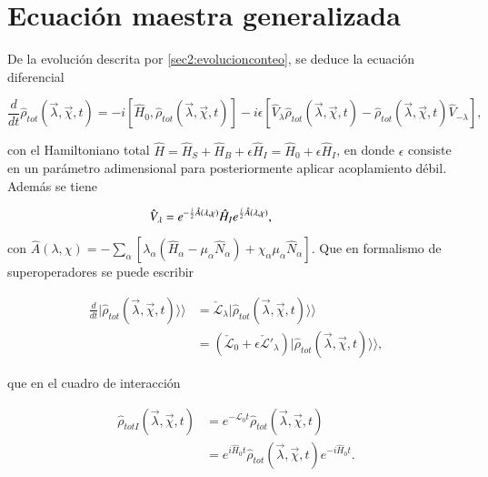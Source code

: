 \label{sec2:superop}

\newpage

\section{Ecuación maestra generalizada}
De la evolución descrita por \ref{sec2:evolucionconteo}, se deduce la ecuación diferencial

\begin{equation*}
    \frac{d}{dt}\hat{\rho}_{tot}(\vec{\lambda},\vec{\chi},t) = -i[\hat{H}_{0},\hat{\rho}_{tot}(\vec{\lambda},\vec{\chi},t)] - i\epsilon[\hat{V}_{\lambda} \hat{\rho}_{tot}(\vec{\lambda},\vec{\chi},t) - \hat{\rho}_{tot}(\vec{\lambda},\vec{\chi},t)\hat{V}_{-\lambda}],
\end{equation*}

con el Hamiltoniano total $\hat{H} = \hat{H}_{S} + \hat{H}_{B} + \epsilon \hat{H}_{I} = \hat{H}_{0} + \epsilon \hat{H}_{I}$, en donde $\epsilon$ consiste en un parámetro adimensional para posteriormente aplicar acoplamiento débil. Además se tiene

\begin{equation*}
    \hat{V}_{\lambda} = e^{-\frac{i}{2}\hat{A}(\lambda,\chi)}\hat{H}_{I}e^{\frac{i}{2}\hat{A}(\lambda,\chi)}, \hspace{14mm}  
\end{equation*}

con $\hat{A}(\lambda,\chi) = -\sum_{\alpha}[\lambda_{\alpha}(\hat{H}_{\alpha} - \mu_{\alpha}\hat{N}_{\alpha}) + \chi_{\alpha}\mu_{\alpha}\hat{N}_{\alpha} ]$. Que en formalismo de superoperadores se puede escribir

\begin{align*}
    \frac{d}{dt}|\hat{\rho}_{tot}(\vec{\lambda},\vec{\chi},t)\rangle \rangle  & = \check{\mathcal{L}}_{\lambda}|\hat{\rho}_{tot}(\vec{\lambda},\vec{\chi},t)\rangle \rangle  \\  
        & = (\check{\mathcal{L}}_{0} + \epsilon \check{\mathcal{L}}'_{\lambda} )|\hat{\rho}_{tot}(\vec{\lambda},\vec{\chi},t)\rangle \rangle, 
\end{align*}

que en el cuadro de interacción 

\begin{align*}
    \hat{\rho}_{totI}(\vec{\lambda},\vec{\chi},t) & = e^{-\mathcal{L}_{0}t}\hat{\rho}_{tot}(\vec{\lambda},\vec{\chi},t) \\
    & = e^{i\hat{H}_{0}t}\hat{\rho}_{tot}(\vec{\lambda},\vec{\chi},t)e^{-i\hat{H}_{0}t}.
\end{align*}

